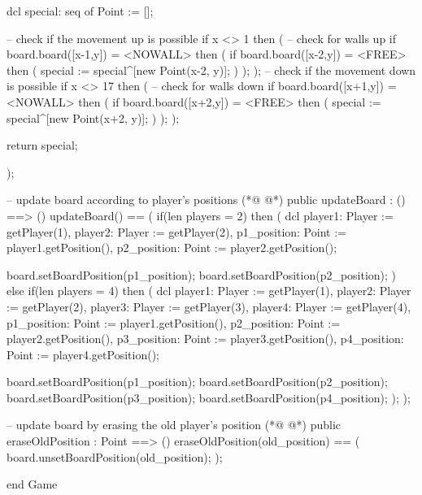 \begin{vdmpp}[breaklines=true]
   dcl special: seq of Point := [];
   
   -- check if the movement up is possible
   if x <> 1
   then
   (
    -- check for walls up
    if board.board([x-1,y]) = <NOWALL>
    then
    (
     if board.board([x-2,y]) = <FREE>
     then
     (
      special := special^[new Point(x-2, y)];
     )
    );
   );
   -- check if the movement down is possible
   if x <> 17
   then
   (
    -- check for walls down
    if board.board([x+1,y]) = <NOWALL>
    then
    (
     if board.board([x+2,y]) = <FREE>
     then
     (
      special := special^[new Point(x+2, y)];
     )
    );
   );
  
   return special;
   
  );
  
  -- update board according to player's positions
(*@
\label{updateBoard:463}
@*)
  public updateBoard : () ==> () 
  updateBoard() ==
  (
   if(len players = 2) 
   then (
    dcl player1: Player := getPlayer(1),
    player2: Player := getPlayer(2),
    p1_position: Point := player1.getPosition(),
    p2_position: Point := player2.getPosition();
    
    board.setBoardPosition(p1_position);
    board.setBoardPosition(p2_position);
   )
   else if(len players = 4)
   then (
    dcl player1: Player := getPlayer(1),
    player2: Player := getPlayer(2),
    player3: Player := getPlayer(3),
    player4: Player := getPlayer(4),
    p1_position: Point := player1.getPosition(),
    p2_position: Point := player2.getPosition(),
    p3_position: Point := player3.getPosition(),
    p4_position: Point := player4.getPosition();
    
    board.setBoardPosition(p1_position);
    board.setBoardPosition(p2_position);
    board.setBoardPosition(p3_position);
    board.setBoardPosition(p4_position);
   );
  );
  
  -- update board by erasing the old player's position
(*@
\label{eraseOldPosition:495}
@*)
  public eraseOldPosition : Point ==> ()
  eraseOldPosition(old_position) ==
  (
   board.unsetBoardPosition(old_position);
  );

end Game
\end{vdmpp}
\bigskip
